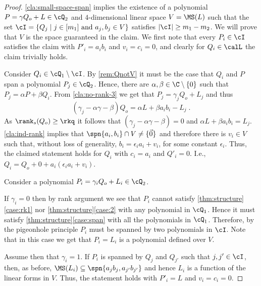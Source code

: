 \begin{proof}
 \autoref{cla:small-space-span} implies the existence of a polynomial $P = \gamma Q_o +  L \in \cQ_2$ and $4$-dimensional linear space $V=\MS(L)$ such that the set
$\cI = \lbrace Q_j\mid j\in [m_1]\text{ and }a_j,b_j \in V\rbrace$ satisfies  $\vert \cI \vert \geq m_1-m_2$. We will prove that $V$ is the space guaranteed in the claim. We first note that every $P_i \in \cI$ satisfies the claim with $P'_i = a_ib_i$ and $v_i=c_i =0$, and clearly for
$Q_i \in \calL$ the claim trivially holds.


Consider $Q_i \in \cQ_1 \setminus \cI$. By \autoref{rem:QnotV} it must be the case that $Q_i$ and $P$ span a polynomial $P_j \in \cQ_2$. Hence, there are $\alpha,\beta \in \C\setminus \{0\}$ such that $P_j = \alpha P + \beta Q_i$. From \autoref{cla:no-rank-3} we get that $P_j = \gamma_j Q_o + L_j$ and thus
 \[(\gamma_j -\alpha \gamma-\beta)Q_o = \alpha L + \beta a_ib_i - L_j \;.\]
As $\rank_s(Q_o) \geq \rkq$ it follows that $(\gamma_j -\alpha \gamma-\beta) = 0$ and $\alpha L + \beta a_ib_i = L_j$.  \autoref{cla:ind-rank} implies that $\spn{a_i,b_i} \cap V \neq \{\vec{0}\}$ and therefore there is $v_i\in V$ such that, without loss of generality, $b_i = \epsilon_i a_i + v_i$, for some constant $\epsilon_i$. Thus, the claimed statement holds for $Q_i$ with $c_i = a_i$ and $Q'_i = 0$. I.e., $Q_i = Q_o + 0+ a_i(\epsilon_i a_i + v_i )$.
 
Consider a polynomial $P_i=\gamma_iQ_o+L_i\in\cQ_2$.

If $\gamma_i=0$ then by rank argument we see that $P_i$ cannot satisfy  \autoref{thm:structure}\ref{case:rk1} nor  \autoref{thm:structure}\ref{case:2} with any polynomial in $\cQ_1$. Hence it must satisfy \autoref{thm:structure}\ref{case:span} with all the polynomials in $\cQ_1$. Therefore, by the pigeonhole principle $P_i$ must be spanned by two polynomials in $\cI$. Note that in this case we get that $P_i = L_i$ is a polynomial defined over $V$.


Assume then that $\gamma_i=1$. If  $P_i$ is spanned by $Q_j$ and $Q_{j'}$ such that  $j,j'\in \cI$, then, as before, $\MS(L_i) \subseteq \spn{a_jb_j , a_{j'}b_{j'}}$ and hence $L_i$ is a function of the linear forms in $V$. Thus, the statement holds with $P'_i = L$ and $v_i=c_i =0$. 



\end{proof}
